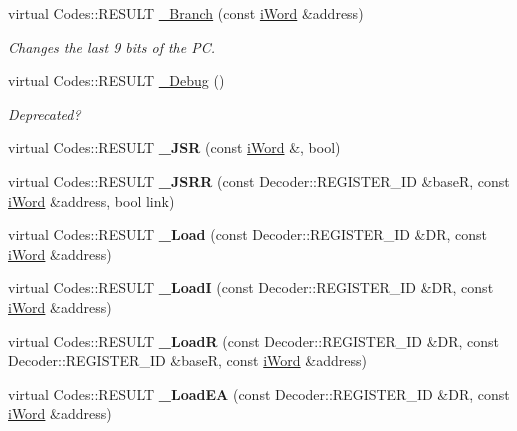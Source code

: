 \begin{DoxyCompactItemize}
\item 
virtual Codes::RESULT \hyperlink{classWi11_a01960bc45e7a70a276d91ff01cd637f9}{\_\-Branch} (const \hyperlink{classiWord}{iWord} \&address)
\begin{DoxyCompactList}\small\item\em Changes the last 9 bits of the PC. \item\end{DoxyCompactList}\item 
virtual Codes::RESULT \hyperlink{classWi11_a10d6c79140c97919e2778d1c4d6f8102}{\_\-Debug} ()
\begin{DoxyCompactList}\small\item\em Deprecated? \item\end{DoxyCompactList}\item 
\hypertarget{classWi11_a52b3325579e31ff96b4b441e682f7a9d}{
virtual Codes::RESULT {\bfseries \_\-JSR} (const \hyperlink{classiWord}{iWord} \&, bool)}
\label{classWi11_a52b3325579e31ff96b4b441e682f7a9d}

\item 
\hypertarget{classWi11_a1237dd5c6468b287113a5d500bef9b3a}{
virtual Codes::RESULT {\bfseries \_\-JSRR} (const Decoder::REGISTER\_\-ID \&baseR, const \hyperlink{classiWord}{iWord} \&address, bool link)}
\label{classWi11_a1237dd5c6468b287113a5d500bef9b3a}

\item 
\hypertarget{classWi11_afb3e3507402d031a76b2e0bf3cc87b66}{
virtual Codes::RESULT {\bfseries \_\-Load} (const Decoder::REGISTER\_\-ID \&DR, const \hyperlink{classiWord}{iWord} \&address)}
\label{classWi11_afb3e3507402d031a76b2e0bf3cc87b66}

\item 
\hypertarget{classWi11_a671e0d7845b262149005cd834cf28c31}{
virtual Codes::RESULT {\bfseries \_\-LoadI} (const Decoder::REGISTER\_\-ID \&DR, const \hyperlink{classiWord}{iWord} \&address)}
\label{classWi11_a671e0d7845b262149005cd834cf28c31}

\item 
\hypertarget{classWi11_a8ebf9deef5d86157aa1f4c01fe888a4f}{
virtual Codes::RESULT {\bfseries \_\-LoadR} (const Decoder::REGISTER\_\-ID \&DR, const Decoder::REGISTER\_\-ID \&baseR, const \hyperlink{classiWord}{iWord} \&address)}
\label{classWi11_a8ebf9deef5d86157aa1f4c01fe888a4f}

\item 
\hypertarget{classWi11_af8489eac0842d1a532be30ccc99f6f49}{
virtual Codes::RESULT {\bfseries \_\-LoadEA} (const Decoder::REGISTER\_\-ID \&DR, const \hyperlink{classiWord}{iWord} \&address)}
\label{classWi11_af8489eac0842d1a532be30ccc99f6f49}


\end{DoxyCompactItemize}
